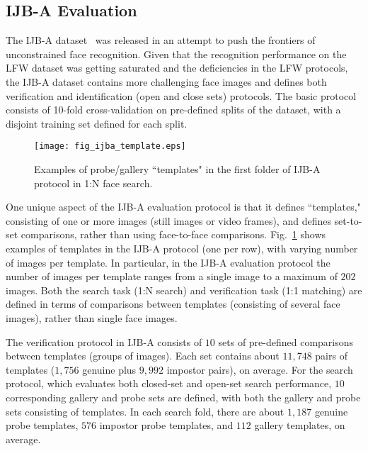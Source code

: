 \documentclass[10pt,journal,compsoc]{IEEEtran}
\begin{document}
\subsection{IJB-A Evaluation}
The IJB-A dataset~\cite{db:janus} was released in an attempt to push the frontiers of unconstrained face recognition. Given that the recognition performance on the LFW dataset was getting saturated and the deficiencies in the LFW protocols, the IJB-A dataset contains more challenging face images and defines both verification and identification (open and close sets) protocols. The basic protocol consists of 10-fold cross-validation on pre-defined splits of the dataset, with a disjoint training set defined for each split.
\begin{figure}[htbp]
    \centering
    \texttt{[image: fig\_ijba\_template.eps]}
    \caption{Examples of probe/gallery ``templates" in the first folder of IJB-A protocol in 1:N face search.}\label{fig:tempaltes}
\end{figure}

One unique aspect of the IJB-A evaluation protocol is that it defines ``templates," consisting of one or more images (still images or video frames), and defines set-to-set comparisons, rather than using face-to-face comparisons. Fig.~\ref{fig:tempaltes} shows examples of templates in the IJB-A protocol (one per row), with varying number of images per template. In particular, in the IJB-A evaluation protocol the number of images per template ranges from a single image to a maximum of $202$ images.  Both the search task (1:N search) and verification task (1:1 matching) are defined in terms of comparisons between templates (consisting of several face images), rather than single face images.

The verification protocol in IJB-A consists of $10$ sets of pre-defined comparisons between templates (groups of images). Each set contains about $11,748$ pairs of templates ($1,756$ genuine plus $9,992$ impostor pairs), on average.
For the search protocol, which evaluates both closed-set and open-set search performance, $10$ corresponding gallery and probe sets are defined, with both the gallery and probe sets consisting of templates. In each search fold, there are about $1,187$ genuine probe templates, $576$ impostor probe templates, and $112$ gallery templates, on average.
\end{document}
